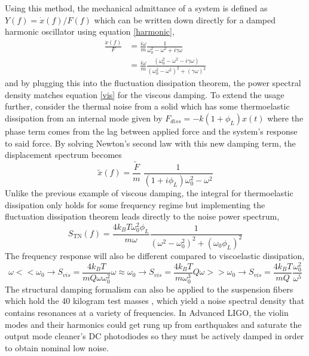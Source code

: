 		Using this method, the mechanical admittance of a system is defined as $Y(f) = \dot{x}(f)/F(f)$ which can be written down directly for a damped harmonic oscillator using equation \ref{harmonic},
		\begin{equation}
			\begin{aligned}
			\frac{\dot{x}(f)}{F} &= \frac{i \omega}{m} \frac{1}{\omega_{0}^2 - \omega^2 +i\gamma \omega}\\
								 &= \frac{i\omega}{m} \frac{(\omega_{0}^2 - \omega^2 - i \gamma \omega)}{(\omega_0^2 - \omega^2)^2 + (\gamma \omega)^2}
			\end{aligned}
		\end{equation}
		and by plugging this into the fluctuation dissipation theorem, the power spectral density matches equation \ref{vis} for the viscous damping.  To extend the usage further, consider the thermal noise from a solid which has some thermoelastic dissipation from an internal mode given by $F_{diss} = -k(1+\phi_L) x(t) $ where the phase term comes from the lag between applied force and the system's response to said force.  By solving Newton's second law with this new damping term, the displacement spectrum becomes 
		\begin{equation}
		\tilde{x}(f) =  \frac{\tilde{F}}{m} \; \frac{1}{(1 + i\phi_L ) \omega_{0}^2 - \omega^2 }
		\end{equation}
		Unlike the previous example of viscous damping, the integral for thermoelastic dissipation only holds for some frequency regime but implementing the fluctuation dissipation theorem leads directly to the noise power spectrum,
		\begin{equation}
			S_{\text{TN}}(f) =  \frac{4k_B T \omega_{0}^2 \phi_L}{m \omega} \frac{1}{(\omega^2 - \omega_{0}^2)^2 + (\omega_{0}\phi_L)^2}
		\end{equation}
		The frequency response will also be different compared to viscoelastic dissipation,
		\begin{subequations}
			\begin{equation}
			\omega<< \omega_{0} \rightarrow S_{vis} = \frac{4k_B T}{m Q \omega \omega_{0}^2}
			\end{equation}
			\begin{equation}
			\omega \approx \omega_{0} \rightarrow S_{vis} = \frac{4k_B T}{m \omega_{0}^3} Q
			\end{equation}
			\begin{equation}
			\omega >> \omega_{0} \rightarrow S_{vis} = \frac{4k_B T}{m Q} \frac{\omega_0^2}{\omega^5} 
			\end{equation}
		\end{subequations}
		The structural damping formalism can also be applied to the suspension fibers which hold the 40 kilogram test masses \cite{SaulsonThermalSus}, \cite{Saulson} which yield a noise spectral density that contains resonances at a variety of frequencies. In Advanced LIGO, the violin modes and their harmonics could get rung up from earthquakes and saturate the output mode cleaner's DC photodiodes so they must be actively damped in order to obtain nominal low noise.
		
